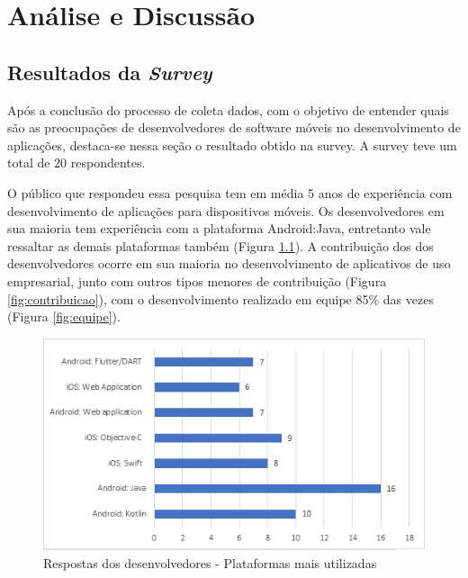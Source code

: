 \chapter{\label{chap:intro}Análise e Discussão}
 




\section{Resultados da \textit{Survey}}

Após a conclusão do processo de coleta dados, com o objetivo de entender quais são as preocupações de desenvolvedores de software móveis no desenvolvimento de aplicações, destaca-se nessa seção o resultado obtido na survey. A survey teve um total de 20 respondentes.

O público que respondeu essa pesquisa tem em média 5 anos de experiência com desenvolvimento de aplicações  para dispositivos móveis. Os desenvolvedores em sua maioria tem experiência com a plataforma Android:Java, entretanto vale ressaltar as demais plataformas também (Figura \ref{fig:plataformas}). A contribuição dos dos desenvolvedores ocorre em sua maioria no desenvolvimento de aplicativos de uso empresarial, junto com outros tipos menores de contribuição (Figura \ref{fig:contribuicao}), com o desenvolvimento realizado em equipe 85{\%} das vezes (Figura \ref{fig:equipe}).

\begin{figure}[!b]
\vspace{1.8cm}
\centering
\includegraphics[scale=0.8]{fig/plataformas.PNG}
\caption{Respostas dos desenvolvedores - Plataformas mais utilizadas}
\label{fig:plataformas}

\end{figure}


